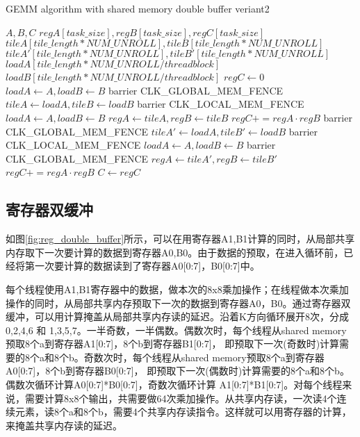\begin{algorithm}[htbp]
	\small
	\caption{GEMM algorithm with shared memory double buffer veriant2}\label{alg:gemm_sharedmem_v2}
	\begin{algorithmic}[1]
		\State $A, B, C$
		\State $regA[task\_size],regB[task\_size],regC[task\_size]$
		\State $tileA[tile\_length*NUM\_UNROLL],tileB[tile\_length*NUM\_UNROLL]$
		\State $tileA'[tile\_length*NUM\_UNROLL],tileB'[tile\_length*NUM\_UNROLL]$
		\State $loadA[tile\_length*NUM\_UNROLL/threadblock]$
		\State $loadB[tile\_length*NUM\_UNROLL/threadblock]$
		\State $regC \gets 0$
		\State $loadA \gets A, loadB \gets B $
		\State barrier CLK\_GLOBAL\_MEM\_FENCE
		\State $tileA \gets loadA, tileB \gets loadB$
		\State barrier CLK\_LOCAL\_MEM\_FENCE
		\State $loadA \gets A, loadB \gets B $
		\State $regA \gets tileA, regB \gets tileB$
		\State $regC += regA \cdot regB$
		\EndFor
		\Else
		\State barrier CLK\_GLOBAL\_MEM\_FENCE  
		\State $tileA' \gets loadA, tileB' \gets loadB$
		\State barrier CLK\_LOCAL\_MEM\_FENCE
		\State $loadA \gets A, loadB \gets B $
		\State barrier CLK\_GLOBAL\_MEM\_FENCE
		\State $regA \gets tileA', regB \gets tileB'$
		\State $regC += regA \cdot regB$
		\EndFor
		\EndIf
		\EndFor\label{gemmendfor}
		\State $C \gets regC$
	\end{algorithmic}
\end{algorithm}

\subsection{寄存器双缓冲}
如图\ref{fig:reg_double_buffer}所示，可以在用寄存器A1,B1计算的同时，从局部共享内存取下一次要计算的数据到寄存器A0,B0。由于数据的预取，在进入循环前，已经将第一次要计算的数据读到了寄存器A0[0:7]，B0[0:7]中。

每个线程使用A1,B1寄存器中的数据，做本次的8x8乘加操作；在线程做本次乘加操作的同时，从局部共享内存预取下一次的数据到寄存器A0，B0。通过寄存器双缓冲，可以用计算掩盖从局部共享内存读的延迟。沿着K方向循环展开8次，分成0,2,4,6 和 1,3,5,7。一半奇数，一半偶数。偶数次时，每个线程从shared memory预取8个a到寄存器A1[0:7]，8个b到寄存器B1[0:7]， 即预取下一次(奇数时)计算需要的8个a和8个b。奇数次时，每个线程从shared memory预取8个a到寄存器A0[0:7]，8个b到寄存器B0[0:7]， 即预取下一次(偶数时)计算需要的8个a和8个b。偶数次循环计算A0[0:7]*B0[0:7]，奇数次循环计算 A1[0:7]*B1[0:7]。对每个线程来说，需要计算8x8个输出，共需要做64次乘加操作。从共享内存读，一次读4个连续元素，读8个a和8个b，需要4个共享内存读指令。这样就可以用寄存器的计算，来掩盖共享内存读的延迟。

